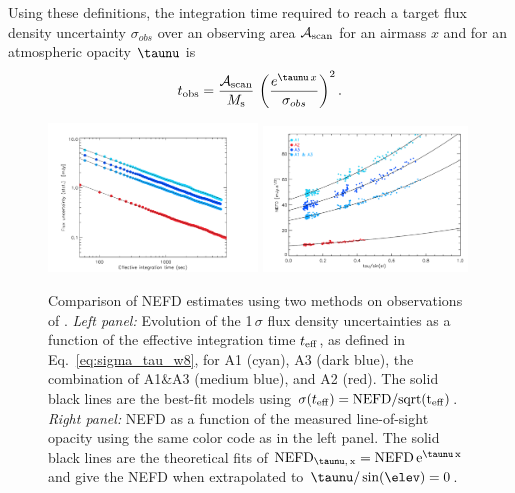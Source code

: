 Using these definitions, the integration time required to reach a target flux
density uncertainty $\sigma_{obs}$ over an observing area
$\mathcal{A}_{\rm{scan}}$ for an airmass $x$ and for an atmospheric opacity $\taunu$ is
\begin{equation}
  t_{\rm{obs}} = \frac{\mathcal{A}_{\rm{scan}}}{ M_{\rm{s}}} \, \left(\frac{e^{\taunu\, x}}{\sigma_{obs}}\right)^2.
\end{equation}

\begin{figure}[!thbp]
  \begin{center}
    \includegraphics[trim={0.5cm, 0, 0, 0.5cm}, clip, angle=0, width=0.495\textwidth]{Figures/hls_nefd_vst-eps-converted-to.pdf}
    \includegraphics[trim={0.5cm, 0, 0.2cm, 0.5cm}, clip, angle=0, width=0.485\textwidth]{Figures/hls_NEFD_vs_TauElev_all-eps-converted-to.pdf}
    \caption{Comparison of NEFD estimates using two methods on observations of
      \hls. \emph{Left panel:} Evolution of the 1\,$\sigma$ flux density
      uncertainties as a function of the effective integration time
      $t_{\rm{eff}}$, as defined in Eq.~\ref{eq:sigma_tau_w8}, for A1
    (cyan), A3 (dark blue), the combination of A1\&A3 (medium blue),
    and A2 (red). The solid black lines are the best-fit models using
    $\sigma(t_{\rm{eff}}) =  \rm{NEFD}/sqrt(t_{\rm{eff}})$. \emph{Right panel:} NEFD as a function of the
    measured line-of-sight opacity using the same color code as in the
    left panel. The solid black lines are the theoretical
    fits of $\rm{NEFD}_{\taunu,\, x } = \rm{NEFD}\, e^{\taunu\,x}$ and give the
    NEFD when extrapolated to $\taunu/\sin(\elev)= 0$. }
    \label{fig:nefd_twomethods}
  \end{center}
\end{figure}

